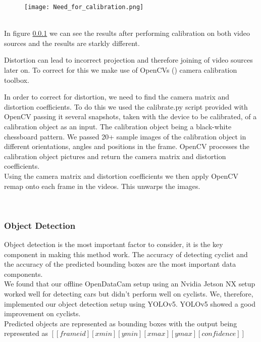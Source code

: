 \begin{figure}[h]
  \texttt{[image: Need\_for\_calibration.png]}
  \centering 
  \end{figure}
  \label{joined_distortion}
\ \\

In figure \ref{} we can see the results after performing calibration on both video sources and the results are starkly different.

Distortion can lead to incorrect projection and therefore joining of video sources later on.
To correct for this we make use of OpenCVs (\cite{noauthor_opencv/opencv_2021}) camera calibration toolbox.

In order to correct for distortion, we need to find the camera matrix and distortion coefficients. To do this we used the calibrate.py script provided with OpenCV
passing it several snapshots, taken with the device to be calibrated, of a calibration object as an input. The calibration object being a black-white chessboard pattern.
We passed 20+ sample images of the calibration object in different orientations, angles and positions in the frame. OpenCV processes the calibration object pictures and
return the camera matrix and distortion coefficients.
\ \\
Using the camera matrix and distortion coefficients we then apply OpenCV remap onto each frame in the videos. This unwarps the images.

\ \\
\subsubsection{Object Detection}

Object detection is the most important factor to consider, it is the key component in making this method work. The accuracy of detecting cyclist and the accuracy of the
predicted bounding boxes are the most important data components.
\ \\

We found that our offline OpenDataCam setup using an Nvidia Jetson NX setup worked well for detecting cars but didn't perform well on cyclists. 
We, therefore, implemented our object detection setup using
YOLOv5. YOLOv5 showed a good improvement on cyclists.
\ \\ 
Predicted objects are represented as bounding boxes with the output being represented as $[[frame id][xmin][ymin][xmax][ymax][confidence]]$

